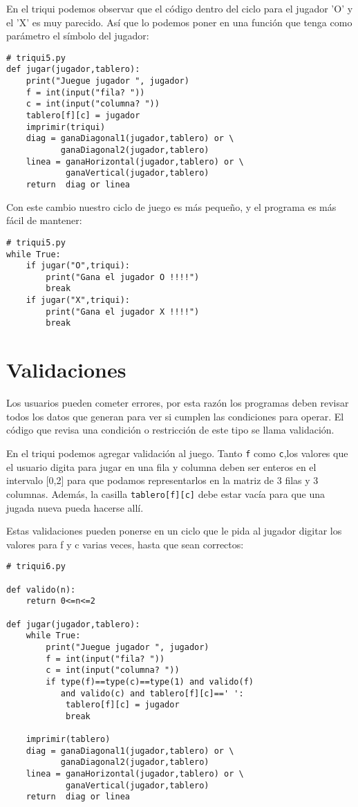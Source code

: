 En el triqui podemos observar que el código dentro del ciclo para
el jugador 'O' y el 'X' es muy parecido. Así que lo podemos poner
en una función que tenga como parámetro el símbolo del jugador:

\begin{lstlisting}
# triqui5.py
def jugar(jugador,tablero):
    print("Juegue jugador ", jugador)
    f = int(input("fila? "))
    c = int(input("columna? "))
    tablero[f][c] = jugador
    imprimir(triqui)
    diag = ganaDiagonal1(jugador,tablero) or \
           ganaDiagonal2(jugador,tablero)
    linea = ganaHorizontal(jugador,tablero) or \ 
            ganaVertical(jugador,tablero)
    return  diag or linea
\end{lstlisting}
Con este cambio nuestro ciclo de juego es más pequeño, y el programa
es más fácil de mantener:

\begin{lstlisting}
# triqui5.py
while True:
    if jugar("O",triqui):
        print("Gana el jugador O !!!!")
        break
    if jugar("X",triqui):
        print("Gana el jugador X !!!!")
        break
\end{lstlisting}
\section{Validaciones}


Los usuarios pueden cometer errores, por esta razón los programas
deben revisar todos los datos que generan para ver si cumplen las
condiciones para operar. El código que revisa una condición o restricción
de este tipo se llama validación.

En el triqui podemos agregar validación al juego. Tanto \texttt{f}
como \texttt{c},los valores que el usuario digita para jugar en una
fila y columna deben ser enteros en el intervalo {[}0,2{]} para que
podamos representarlos en la matriz de 3 filas y 3 columnas. Además,
la casilla \texttt{tablero{[}f{]}{[}c{]}} debe estar vacía para que
una jugada nueva pueda hacerse allí.

Estas validaciones pueden ponerse en un ciclo que le pida al jugador
digitar los valores para f y c varias veces, hasta que sean correctos:

\inputencoding{latin9}\begin{lstlisting}
# triqui6.py

def valido(n):
    return 0<=n<=2
    
def jugar(jugador,tablero):
    while True:     
        print("Juegue jugador ", jugador)
        f = int(input("fila? "))
        c = int(input("columna? "))
        if type(f)==type(c)==type(1) and valido(f) 
           and valido(c) and tablero[f][c]==' ':
            tablero[f][c] = jugador
            break      

    imprimir(tablero)
    diag = ganaDiagonal1(jugador,tablero) or \
           ganaDiagonal2(jugador,tablero)
    linea = ganaHorizontal(jugador,tablero) or \
            ganaVertical(jugador,tablero)
    return  diag or linea
\end{lstlisting}
\inputencoding{utf8}

